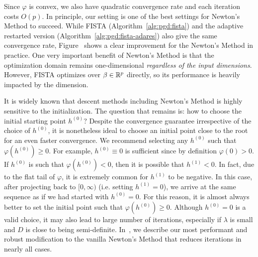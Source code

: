 Since $\varphi$ is convex, we also have quadratic convergence rate and each iteration costs $O(p)$.
In principle, our setting is one of the best settings for Newton's Method to succeed.
While FISTA (Algorithm~\ref{alg:pgd:fista}) and the adaptive restarted version
(Algorithm~\ref{alg:pgd:fista-adares}) also give the same convergence rate,
Figure~ 
shows a clear improvement for the Newton's Method in practice.
One very important benefit of Newton's Method is that the optimization domain
remains one-dimensional \emph{regardless of the input dimensions}.
However, FISTA optimizes over $\beta \in \mathbb{R}^p$ directly, so its performance is heavily
impacted by the dimension.

It is widely known that descent methods including Newton's Method
is highly sensitive to the initialization.
The question that remains is: how to choose the initial starting point $h^{(0)}$?
Despite the convergence guarantee irrespective of the choice of $h^{(0)}$,
it is nonetheless ideal to choose an initial point close to the root for an even faster convergence.
We recommend selecting any $h^{(0)}$ such that $\varphi(h^{(0)}) \geq 0$.
For example, $h^{(0)} \equiv 0$ is sufficient since by definition $\varphi(0) > 0$.
If $h^{(0)}$ is such that $\varphi(h^{(0)}) < 0$,
then it is possible that $h^{(1)} < 0$.
In fact, due to the flat tail of $\varphi$, it is extremely common for $h^{(1)}$ to be negative.
In this case, after projecting back to $[0, \infty)$ (i.e. setting $h^{(1)} = 0$),
we arrive at the same sequence as if we had started with $h^{(0)} = 0$.
For this reason, it is almost always better to 
set the initial point such that $\varphi(h^{(0)}) \geq 0$.
Although $h^{(0)} = 0$ is a valid choice, it may also lead to large number of iterations,
especially if $\lambda$ is small and $D$ is close to being semi-definite.
In~, we describe our most performant and robust 
modification to the vanilla Newton's Method that reduces iterations in nearly all cases.
